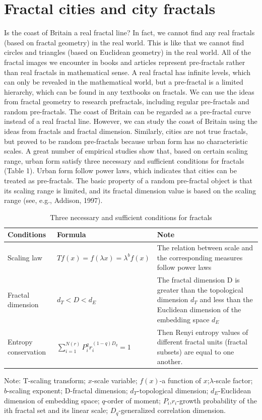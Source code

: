 \documentclass{article}
\begin{document}
\section{Fractal cities and city fractals}
Is the coast of Britain a real fractal line? In fact, we cannot find any real fractals (based on fractal
geometry) in the real world. This is like that we cannot find circles and triangles (based on Euclidean
geometry) in the real world. All of the fractal images we encounter in books and articles represent
pre-fractals rather than real fractals in mathematical sense. A real fractal has infinite levels, which
can only be revealed in the mathematical world, but a pre-fractal is a limited hierarchy, which can
be found in any textbooks on fractals. We can use the ideas from fractal geometry to research prefractals, including regular pre-fractals and random pre-fractals. The coast of Britain can be regarded
as a pre-fractal curve instead of a real fractal line. However, we can study the coast of Britain using
the ideas from fractals and fractal dimension. Similarly, cities are not true fractals, but proved to be
random pre-fractals because urban form has no characteristic scales. A great number of empirical
studies show that, based on certain scaling range, urban form satisfy three necessary and sufficient
conditions for fractals (Table 1). Urban form follow power laws, which indicates that cities can be treated as pre-fractals. The basic property of a random pre-fractal object is that its scaling range is
limited, and its fractal dimension value is based on the scaling range (see, e.g., Addison, 1997). 

\centering
\begin{table}[h]
\caption{Three necessary and sufficient conditions for fractals}
\begin{tabular}{|l|l|p{4.2cm}|}
\hline
Conditions & Formula & Note \\
\hline
Scaling law & $Tf(x)=f(\lambda x)=\lambda^b f(x)$ & The  relation between scale and the
corresponding measures follow power laws \\
\hline
Fractal dimension & $d_{T} < D < d_{E}$ & The fractal dimension D is greater than the
topological dimension $d_{T}$ and less than the
Euclidean dimension of the embedding space $d_{E}$ \\
\hline
Entropy conservation & $\displaystyle\sum_{i=1}^{N(r)}P_{i}^q r_{i}^{(1-q)D_{q}} = 1$ & Then Renyi entropy values of different fractal
units (fractal subsets) are equal to one another. \\
\hline
\end{tabular}
\small
Note: T-scaling transform; $x$-scale variable; $f(x)$-a function of $x$;$\lambda$-scale factor; $b$-scaling exponent; D-fractal dimension; $d_{T}$-topological dimension; $d_{E}$-Euclidean dimension of embedding space; $q$-order of moment;
$P_{i}$,$r_{i}$-growth probability of the ith fractal set and its linear scale; $D_{q}$-generalized correlation dimension.

\end{table}
\end{document}
